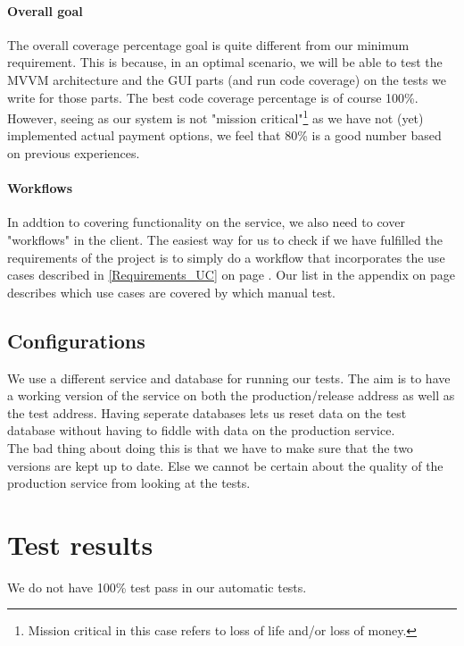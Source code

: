 \paragraph{Overall goal}
The overall coverage percentage goal is quite different from our minimum requirement. This is because, in an optimal scenario, we will be able to test the MVVM architecture and the GUI parts (and run code coverage) on the tests we write for those parts. The best code coverage percentage is of course 100\%. However, seeing as our system is not "mission critical"\footnote{Mission critical in this case refers to loss of life and/or loss of money.} as we have not (yet) implemented actual payment options, we feel that 80\% is a good number based on previous experiences.

\paragraph{Workflows}
\label{Testing_Strategy_Coverage_Workflows}
In addtion to covering functionality on the service, we also need to cover "workflows" in the client. The easiest way for us to check if we have fulfilled the requirements of the project is to simply do a workflow that incorporates the use cases described in \ref{Requirements_UC} on page \pageref{Requirements_UC}. Our list in the appendix on page \pageref{Appendix_Test_Manual} describes which use cases are covered by which manual test.

\subsection{Configurations}
\label{Testing_Strategy_Configurations}
We use a different service and database for running our tests. The aim is to have a working version of the service on both the production/release address as well as the test address. Having seperate databases lets us reset data on the test database without having to fiddle with data on the production service.
\\The bad thing about doing this is that we have to make sure that the two versions are kept up to date. Else we cannot be certain about the quality of the production service from looking at the tests.

\section{Test results}
\label{Testing_Results}
We do not have 100\% test pass in our automatic tests. 
